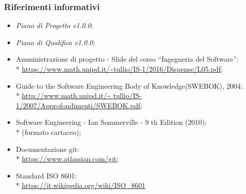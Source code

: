\subsubsection{Riferimenti informativi}
\begin{itemize}
\item \textit{Piano di Progetto v1.0.0};
\item \textit{Piano di Qualifica v1.0.0};
\item Amministrazione di progetto - Slide del corso “Ingegneria del
Software”: \\*
	\url{https://www.math.unipd.it/~tullio/IS-1/2016/Dispense/L05.pdf};
\item Guide to the Software Engineering Body of Knowledge(SWEBOK), 2004: \\*
	\url{http://www.math.unipd.it/~	tullio/IS-1/2007/Approfondimenti/SWEBOK.pdf};
\item Software Engineering - Ian Sommerville - 9 th Edition (2010): \\*
(formato cartaceo);
\item Documentazione git: \\*
	\url{https://www.atlassian.com/git};
	\item Standard ISO 8601: \\*
	\url{https://it.wikipedia.org/wiki/ISO_8601}
\end{itemize}